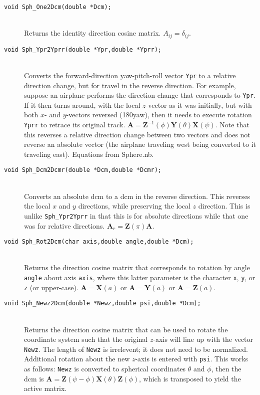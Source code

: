 \documentclass[11pt]{article}
\newcommand {\ttt} {\texttt}
\begin{document}
\begin{description}
\item[\ttt{void Sph\_One2Dcm(double *Dcm);}]
\hfill \\
Returns the identity direction cosine matrix. $A_{ij} = \delta_{ij}$.


\item[\ttt{void Sph\_Ypr2Yprr(double *Ypr,double *Yprr);}]
\hfill \\
Converts the forward-direction yaw-pitch-roll vector \ttt{Ypr} to a relative direction change, but for travel in the reverse direction. For example, suppose an airplane performs the direction change that corresponds to \ttt{Ypr}. If it then turns around, with the local $z$-vector as it was initially, but with both $x$- and $y$-vectors reversed (180\degree yaw), then it needs to execute rotation \ttt{Yprr} to retrace its original track. $\bm{A} = \bm{Z}^{-1}(\phi)\bm{Y}(\theta)\bm{X}(\psi)$. Note that this reverses a relative direction change between two vectors and does not reverse an absolute vector (the airplane traveling west being converted to it traveling east). Equations from Sphere.nb.


\item[\ttt{void Sph\_Dcm2Dcmr(double *Dcm,double *Dcmr);}]
\hfill \\
Converts an absolute dcm to a dcm in the reverse direction. This reverses the local $x$ and $y$ directions, while preserving the local $z$ direction. This is unlike \ttt{Sph\_Ypr2Yprr} in that this is for absolute directions while that one was for relative directions. $\bm{A}_r = \bm{Z}(\pi)\bm{A}$.


\item[\ttt{void Sph\_Rot2Dcm(char axis,double angle,double *Dcm);}]
\hfill \\
Returns the direction cosine matrix that corresponds to rotation by angle \ttt{angle} about axis \ttt{axis}, where this latter parameter is the character \ttt{x}, \ttt{y}, or \ttt{z} (or upper-case). $\bm{A} = \bm{X}(a)$ or $\bm{A} = \bm{Y}(a)$ or $\bm{A} = \bm{Z}(a)$.


\item[\ttt{void Sph\_Newz2Dcm(double *Newz,double psi,double *Dcm);}]
\hfill \\
Returns the direction cosine matrix that can be used to rotate the coordinate system such that the original $z$-axis will line up with the vector \ttt{Newz}. The length of \ttt{Newz} is irrelevent; it does not need to be normalized. Additional rotation about the new $z$-axis is entered with \ttt{psi}. This works as follows: \ttt{Newz} is converted to spherical coordinates $\theta$ and $\phi$, then the dcm is $\bm{A} = \bm{Z}(\psi-\phi) \bm{X}(\theta) \bm{Z}(\phi)$, which is transposed to yield the active matrix.



\end{description}
\end{document}
